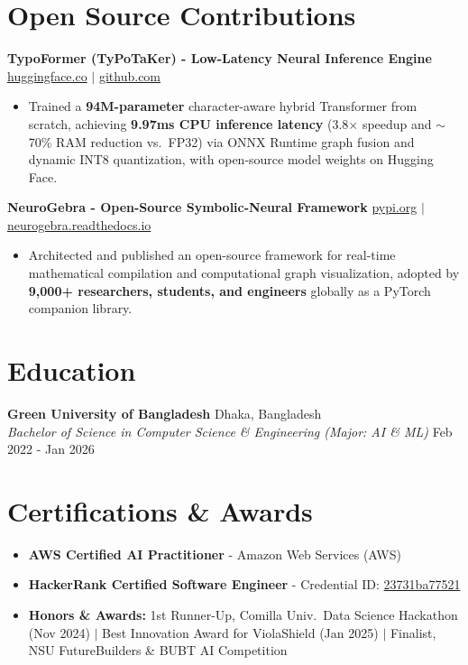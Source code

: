 \documentclass[9.5pt,a4paper]{article}
\begin{document}
\section*{Open Source Contributions}
\noindent
\textbf{TypoFormer (TyPoTaKer) - Low-Latency Neural Inference Engine} \hfill \href{https://huggingface.co/fahiiim/TypoFormer}{huggingface.co} $\vert$ \href{https://github.com/fahiiim/TyPoTaKer}{github.com}
\begin{itemize}
    \item Trained a \textbf{94M-parameter} character-aware hybrid Transformer from scratch, achieving \textbf{9.97ms CPU inference latency} (3.8$\times$ speedup and $\sim$70\% RAM reduction vs.\ FP32) via ONNX Runtime graph fusion and dynamic INT8 quantization, with open-source model weights on Hugging Face.
\end{itemize}
\vspace{0.2pt}
\noindent
\textbf{NeuroGebra - Open-Source Symbolic-Neural Framework} \hfill \href{https://pypi.org/project/neurogebra/}{pypi.org} $\vert$ \href{https://neurogebra.readthedocs.io}{neurogebra.readthedocs.io}
\begin{itemize}
    \item Architected and published an open-source framework for real-time mathematical compilation and computational graph visualization, adopted by \textbf{9,000+ researchers, students, and engineers} globally as a PyTorch companion library.
\end{itemize}
\vspace{0.2pt}

\section*{Education}
\noindent
\textbf{Green University of Bangladesh} \hfill Dhaka, Bangladesh\\
\textit{Bachelor of Science in Computer Science \& Engineering (Major: AI \& ML)} \hfill Feb 2022 - Jan 2026

\section*{Certifications \& Awards}
\begin{itemize}
    \item \textbf{AWS Certified AI Practitioner} - Amazon Web Services (AWS)
    \item \textbf{HackerRank Certified Software Engineer} - Credential ID: \href{https://www.hackerrank.com/certificates/23731ba77521}{23731ba77521}
    \item \textbf{Honors \& Awards:} 1st Runner-Up, Comilla Univ.\ Data Science Hackathon (Nov 2024) $\vert$ Best Innovation Award for ViolaShield (Jan 2025) $\vert$ Finalist, NSU FutureBuilders \& BUBT AI Competition
\end{itemize}
\end{document}
